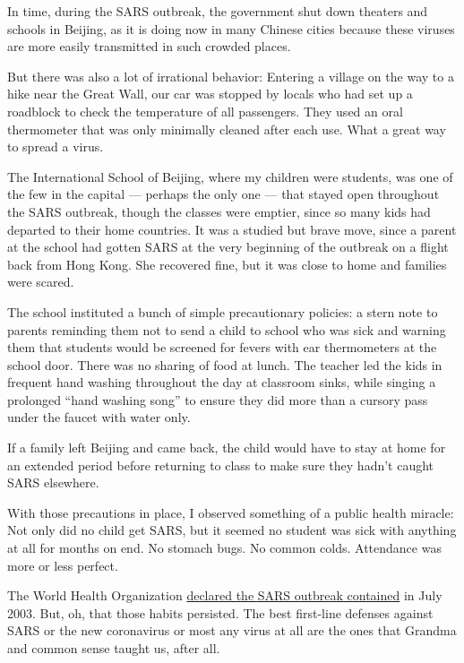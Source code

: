 In time, during the SARS outbreak, the government shut down theaters and
schools in Beijing, as it is doing now in many Chinese cities because
these viruses are more easily transmitted in such crowded places.

But there was also a lot of irrational behavior: Entering a village on
the way to a hike near the Great Wall, our car was stopped by locals who
had set up a roadblock to check the temperature of all passengers. They
used an oral thermometer that was only minimally cleaned after each use.
What a great way to spread a virus.

The International School of Beijing, where my children were students,
was one of the few in the capital --- perhaps the only one --- that
stayed open throughout the SARS outbreak, though the classes were
emptier, since so many kids had departed to their home countries. It was
a studied but brave move, since a parent at the school had gotten SARS
at the very beginning of the outbreak on a flight back from Hong Kong.
She recovered fine, but it was close to home and families were scared.

The school instituted a bunch of simple precautionary policies: a stern
note to parents reminding them not to send a child to school who was
sick and warning them that students would be screened for fevers with
ear thermometers at the school door. There was no sharing of food at
lunch. The teacher led the kids in frequent hand washing throughout the
day at classroom sinks, while singing a prolonged ``hand washing song''
to ensure they did more than a cursory pass under the faucet with water
only.

If a family left Beijing and came back, the child would have to stay at
home for an extended period before returning to class to make sure they
hadn't caught SARS elsewhere.

With those precautions in place, I observed something of a public health
miracle: Not only did no child get SARS, but it seemed no student was
sick with anything at all for months on end. No stomach bugs. No common
colds. Attendance was more or less perfect.

The World Health Organization
\href{https://www.history.com/this-day-in-history/world-health-organization-declares-sars-contained-worldwide}{declared
the SARS outbreak contained} in July 2003. But, oh, that those habits
persisted. The best first-line defenses against SARS or the new
coronavirus or most any virus at all are the ones that Grandma and
common sense taught us, after all.

